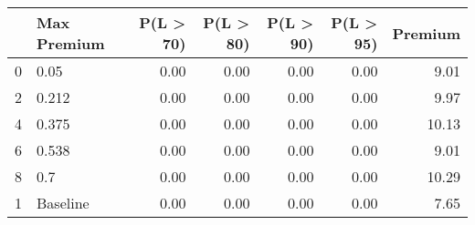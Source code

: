\begin{tabular}{llrrrrr}
\toprule
{} & Max Premium &  P(L > 70) &  P(L > 80) &  P(L > 90) &  P(L > 95) &  Premium \\
\midrule
0 &        0.05 &       0.00 &       0.00 &       0.00 &       0.00 &     9.01 \\
2 &       0.212 &       0.00 &       0.00 &       0.00 &       0.00 &     9.97 \\
4 &       0.375 &       0.00 &       0.00 &       0.00 &       0.00 &    10.13 \\
6 &       0.538 &       0.00 &       0.00 &       0.00 &       0.00 &     9.01 \\
8 &         0.7 &       0.00 &       0.00 &       0.00 &       0.00 &    10.29 \\
1 &    Baseline &       0.00 &       0.00 &       0.00 &       0.00 &     7.65 \\
\bottomrule
\end{tabular}
